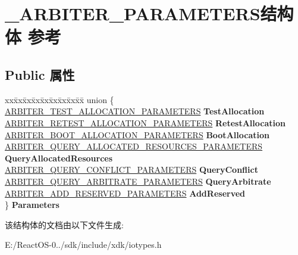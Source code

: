 \hypertarget{struct___a_r_b_i_t_e_r___p_a_r_a_m_e_t_e_r_s}{}\section{\+\_\+\+A\+R\+B\+I\+T\+E\+R\+\_\+\+P\+A\+R\+A\+M\+E\+T\+E\+R\+S结构体 参考}
\label{struct___a_r_b_i_t_e_r___p_a_r_a_m_e_t_e_r_s}
\subsection*{Public 属性}
\begin{DoxyCompactItemize}
\item 
\mbox{\label{struct___a_r_b_i_t_e_r___p_a_r_a_m_e_t_e_r_s_ac8f09d88a8a10f0d08fa1ab93923df51}} 
\begin{tabbing}
xx\=xx\=xx\=xx\=xx\=xx\=xx\=xx\=xx\=\kill
union \{\\
\>\hyperlink{struct___a_r_b_i_t_e_r___t_e_s_t___a_l_l_o_c_a_t_i_o_n___p_a_r_a_m_e_t_e_r_s}{ARBITER\_TEST\_ALLOCATION\_PARAMETERS} {\bfseries TestAllocation}\\
\>\hyperlink{struct___a_r_b_i_t_e_r___r_e_t_e_s_t___a_l_l_o_c_a_t_i_o_n___p_a_r_a_m_e_t_e_r_s}{ARBITER\_RETEST\_ALLOCATION\_PARAMETERS} {\bfseries RetestAllocation}\\
\>\hyperlink{struct___a_r_b_i_t_e_r___b_o_o_t___a_l_l_o_c_a_t_i_o_n___p_a_r_a_m_e_t_e_r_s}{ARBITER\_BOOT\_ALLOCATION\_PARAMETERS} {\bfseries BootAllocation}\\
\>\hyperlink{struct___a_r_b_i_t_e_r___q_u_e_r_y___a_l_l_o_c_a_t_e_d___r_e_s_o_u_r_c_e_s___p_a_r_a_m_e_t_e_r_s}{ARBITER\_QUERY\_ALLOCATED\_RESOURCES\_PARAMETERS} {\bfseries QueryAllocatedResources}\\
\>\hyperlink{struct___a_r_b_i_t_e_r___q_u_e_r_y___c_o_n_f_l_i_c_t___p_a_r_a_m_e_t_e_r_s}{ARBITER\_QUERY\_CONFLICT\_PARAMETERS} {\bfseries QueryConflict}\\
\>\hyperlink{struct___a_r_b_i_t_e_r___q_u_e_r_y___a_r_b_i_t_r_a_t_e___p_a_r_a_m_e_t_e_r_s}{ARBITER\_QUERY\_ARBITRATE\_PARAMETERS} {\bfseries QueryArbitrate}\\
\>\hyperlink{struct___a_r_b_i_t_e_r___a_d_d___r_e_s_e_r_v_e_d___p_a_r_a_m_e_t_e_r_s}{ARBITER\_ADD\_RESERVED\_PARAMETERS} {\bfseries AddReserved}\\
\} {\bfseries Parameters}\\

\end{tabbing}\end{DoxyCompactItemize}


该结构体的文档由以下文件生成\+:\begin{DoxyCompactItemize}
\item 
E\+:/\+React\+O\+S-\/0../sdk/include/xdk/iotypes.\+h\end{DoxyCompactItemize}
